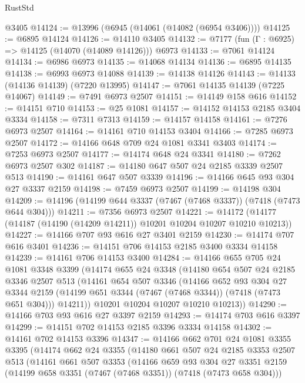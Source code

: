 \begin{lexlean}{RustStd}
\begin{coremodule}
    @3405
@14124 := @13996 (@6945 (@14061 (@14082 (@6954 @3406))))
@14125 := @6895 @14124
@14126 := @14110 @3405
@14132 := @7177 (fun (Γ : @6925) => @14125 (@14070 (@14089 @14126))) @6973
@14133 := @7061 @14124
@14134 := @6986 @6973
@14135 := @14068 @14134
@14136 := @6895 @14135
@14138 := @6993 @6973 @14088
@14139 := @14138 @14126
@14143 := @14133 (@14136 @14139) (@7220 @13995)
@14147 := @7061 @14135 @14139 (@7225 @14067)
@14149 := @7491 @6973 @2507
@14151 := @14149 @158 @616
@14152 := @14151 @710
@14153 := @25 @1081
@14157 := @14152 @14153 @2185 @3404 @3334
@14158 := @7311 @7313
@14159 := @14157 @14158
@14161 := @7276 @6973 @2507
@14164 := @14161 @710 @14153 @3404
@14166 := @7285 @6973 @2507
@14172 := @14166 @648 @709 @24 @1081 @3341 @3403
@14174 := @7253 @6973 @2507
@14177 := @14174 @648 @24 @3341
@14180 := @7262 @6973 @2507 @302
@14187 := @14180 @647 @507 @24 @2185 @3339 @2507 @513
@14190 := @14161 @647 @507 @3339
@14196 := @14166 @645 @93 @304 @27 @3337 @2159
@14198 := @7459 @6973 @2507
@14199 := @14198 @304
@14209 := @14196 (@14199 @644 @3337 (@7467 (@7468 @3337)) (@7418 (@7473 @644 @304)))
@14211 := @7356 @6973 @2507
@14221 := @14172 (@14177 (@14187 (@14190 (@14209 @14211)) @10201 @10204 @10207 @10210 @10213))
@14227 := @14166 @707 @93 @616 @27 @3401 @2159
@14230 := @14174 @707 @616 @3401
@14236 := @14151 @706 @14153 @2185 @3400 @3334 @14158
@14239 := @14161 @706 @14153 @3400
@14284 := @14166
    @655
    @705
    @24
    @1081
    @3348
    @3399
    (@14174
      @655
      @24
      @3348
      (@14180
        @654
        @507
        @24
        @2185
        @3346
        @2507
        @513
        (@14161
          @654
          @507
          @3346
          (@14166
            @652
            @93
            @304
            @27
            @3344
            @2159
            (@14199 @651 @3344 (@7467 (@7468 @3344)) (@7418 (@7473 @651 @304)))
            @14211))
        @10201
        @10204
        @10207
        @10210
        @10213))
@14290 := @14166 @703 @93 @616 @27 @3397 @2159
@14293 := @14174 @703 @616 @3397
@14299 := @14151 @702 @14153 @2185 @3396 @3334 @14158
@14302 := @14161 @702 @14153 @3396
@14347 := @14166
    @662
    @701
    @24
    @1081
    @3355
    @3395
    (@14174
      @662
      @24
      @3355
      (@14180
        @661
        @507
        @24
        @2185
        @3353
        @2507
        @513
        (@14161
          @661
          @507
          @3353
          (@14166
            @659
            @93
            @304
            @27
            @3351
            @2159
            (@14199 @658 @3351 (@7467 (@7468 @3351)) (@7418 (@7473 @658 @304)))

\end{coremodule}
\end{lexlean}
